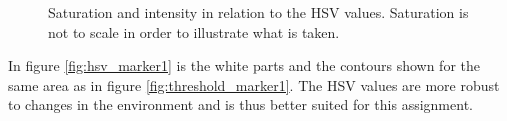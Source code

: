 \begin{figure}[H]
\centering
 \caption[Saturation and intensity in relation to the HSV values.]{Saturation and intensity in relation to the HSV values. Saturation is not to scale in order to illustrate what is taken.}
 \label{fig:hsv_intensity}
\end{figure}


In figure \ref{fig:hsv_marker1} is the white parts and the contours shown for the same area as in figure \ref{fig:threshold_marker1}.
The HSV values are more robust to changes in the environment and is thus better suited for this assignment.

